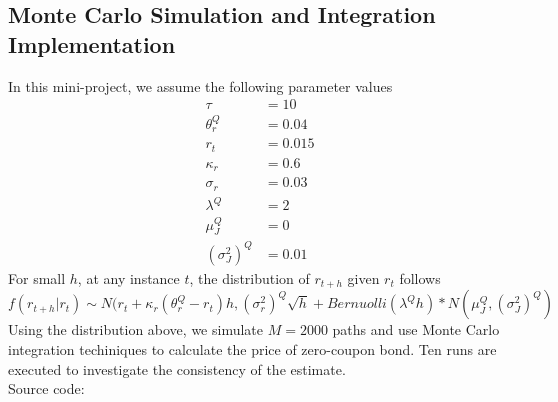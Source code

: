 \subsection{Monte Carlo Simulation and Integration Implementation}
In this mini-project, we assume the following parameter values 
\begin{align*}
  \tau &= 10\\
  \theta_r^Q &= 0.04\\
  r_t &= 0.015\\
  \kappa_r &= 0.6\\
  \sigma_r &= 0.03\\
  \lambda^Q &= 2\\
  \mu_J^Q &= 0\\
  (\sigma_J^2)^Q &= 0.01
\end{align*}
For small $h$, at any instance $t$, the distribution of $r_{t+h}$ given $r_t$ follows 
$$f(r_{t+h}|r_t) \sim N(r_t+\kappa_r(\theta_r^Q-r_t)h,(\sigma_r^2)^Q\sqrt{h}+Bernuolli(\lambda^Qh)*N\left(\mu_J^Q,(\sigma_J^2)^Q\right)$$
Using the distribution above, we simulate $M=2000$ paths and use Monte Carlo integration techiniques to calculate the price of zero-coupon bond. Ten runs are executed to investigate the consistency of the estimate.\\
Source code:\\
